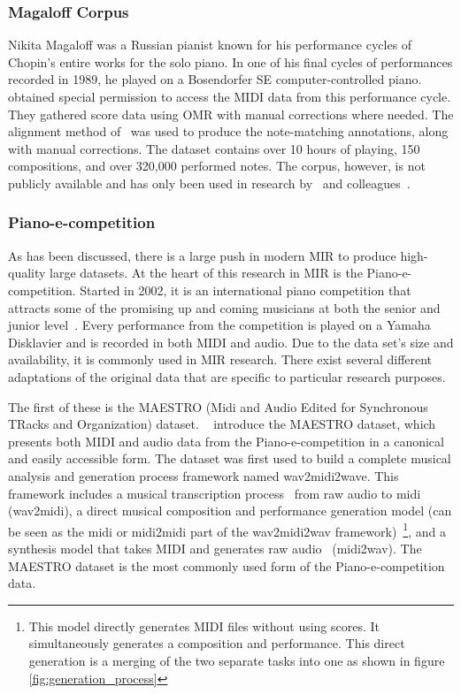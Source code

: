 \subsubsection{Magaloff Corpus}
Nikita Magaloff was a Russian pianist known for his performance cycles of Chopin's entire works for the solo piano. In one of his final cycles of performances recorded in 1989, he played on a Bosendorfer SE computer-controlled piano.~\citet{flossmann2010magaloff} obtained special permission to access the MIDI data from this performance cycle. They gathered score data using OMR with manual corrections where needed.  The alignment method of~\citet{grachten2006expressivity} was used to produce the note-matching annotations, along with manual corrections. The dataset contains over 10 hours of playing, 150 compositions, and over 320,000 performed notes. The corpus, however, is not publicly available and has only been used in research by~\citet{flossmann2010magaloff} and colleagues~\cite{eduardo2018computational}. 

\subsubsection{Piano-e-competition}
As has been discussed, there is a large push in modern MIR to produce high-quality large datasets. At the heart of this research in MIR is the Piano-e-competition. Started in 2002, it is an international piano competition that attracts some of the promising up and coming musicians at both the senior and junior level~\cite{the-disklavier-education-network}. Every performance from the competition is played on a Yamaha Disklavier and is recorded in both MIDI and audio. Due to the data set's size and availability, it is commonly used in MIR research. There exist several different adaptations of the original data that are specific to particular research purposes. 

The first of these is the MAESTRO (Midi and Audio Edited for Synchronous TRacks and Organization) dataset. ~\citet{hawthorne2018enabling} introduce the MAESTRO dataset, which presents both MIDI and audio data from the Piano-e-competition in a canonical and easily accessible form. The dataset was first used to build a complete musical analysis and generation process framework named wav2midi2wave. This framework includes a musical transcription process~\cite{hawthorne2017onsets} from raw audio to midi (wav2midi), a direct musical composition and performance generation model (can be seen as the midi or midi2midi part of the wav2midi2wav framework)~\cite{huang2018music}\footnote{This model directly generates MIDI files without using scores. It simultaneously generates a composition and performance. This direct generation is a merging of the two separate tasks into one as shown in figure \ref{fig:generation_process}}, and a synthesis model that takes MIDI and generates raw audio~\cite{oord2016wavenet} (midi2wav). The MAESTRO dataset is the most commonly used form of the Piano-e-competition data. 

